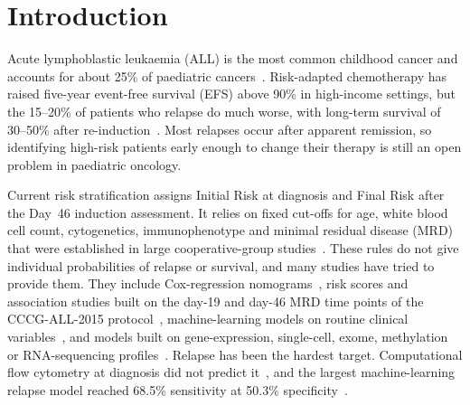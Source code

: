 \documentclass[pdflatex,sn-nature]{sn-jnl}
\begin{document}

\maketitle

\section{Introduction}\label{sec:intro}

Acute lymphoblastic leukaemia (ALL) is the most common childhood
cancer and accounts for about 25\% of paediatric
cancers~\cite{[CITE:Hunger2015]}.
Risk-adapted chemotherapy has raised five-year event-free survival
(EFS) above 90\% in high-income settings, but the 15--20\% of patients
who relapse do much worse, with long-term survival of 30--50\% after
re-induction~\cite{[CITE:Bhojwani2013],[CITE:Pui2008]}.
Most relapses occur after apparent remission, so identifying high-risk
patients early enough to change their therapy is still an open problem
in paediatric oncology.

Current risk stratification assigns Initial Risk at diagnosis and
Final Risk after the Day~46 induction assessment.
It relies on fixed cut-offs for age, white blood cell count,
cytogenetics, immunophenotype and minimal residual disease (MRD) that
were established in large cooperative-group
studies~\cite{[CITE:Schultz2007],[CITE:Borowitz2008],[CITE:Conter2010]}.
These rules do not give individual probabilities of relapse or
survival, and many studies have tried to provide them.
They include Cox-regression
nomograms~\cite{[CITE:Mao2020],[CITE:Zhang2020],[CITE:He2022],[CITE:Sang2026]},
risk scores and association studies built on the day-19 and day-46 MRD
time points of the CCCG-ALL-2015
protocol~\cite{[CITE:Liu2022TALL],[CITE:Chen2025FrontPediatr]},
machine-learning models on routine clinical
variables~\cite{[CITE:Pan2017],[CITE:Mehrbakhsh2024],[CITE:Song2025],[CITE:Cui2025Transformer],[CITE:Saravanan2026]},
and models built on gene-expression, single-cell, exome, methylation
or RNA-sequencing
profiles~\cite{[CITE:Kang2010],[CITE:Fitter2021],[CITE:Good2018],[CITE:Bohannan2022],[CITE:Mosquera2024],[CITE:Zhai2026]}.
Relapse has been the hardest target.
Computational flow cytometry at diagnosis did not predict
it~\cite{[CITE:Martinez2025]}, and the largest machine-learning relapse
model reached 68.5\% sensitivity at 50.3\%
specificity~\cite{[CITE:Saravanan2026]}.
\end{document}
